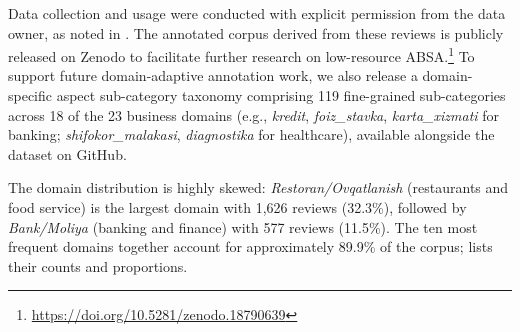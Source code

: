 \documentclass[computers,article,submit,pdftex,moreauthors]{Definitions/mdpi}
\begin{document}
Data collection and usage were conducted with explicit permission from the data owner, as noted in . The annotated corpus derived from these reviews is publicly released on Zenodo to facilitate further research on low-resource ABSA.\footnote{\url{https://doi.org/10.5281/zenodo.18790639}} To support future domain-adaptive annotation work, we also release a domain-specific aspect sub-category taxonomy comprising 119 fine-grained sub-categories across 18 of the 23 business domains (e.g., \textit{kredit}, \textit{foiz\_stavka}, \textit{karta\_xizmati} for banking; \textit{shifokor\_malakasi}, \textit{diagnostika} for healthcare), available alongside the dataset on GitHub.

The domain distribution is highly skewed: \textit{Restoran/Ovqatlanish} (restaurants and food service) is the largest domain with 1{,}626 reviews (32.3\%), followed by \textit{Bank/Moliya} (banking and finance) with 577 reviews (11.5\%). The ten most frequent domains together account for approximately 89.9\% of the corpus;  lists their counts and proportions.
\end{document}
